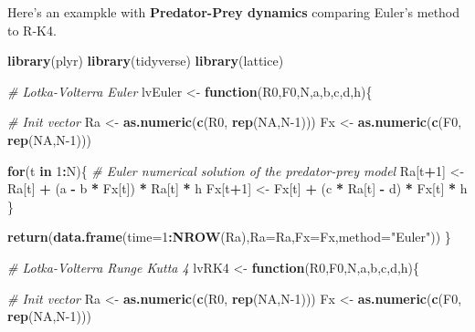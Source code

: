 \documentclass[12pt,]{book}
\newenvironment{Shaded}{\begin{snugshade}}{\end{snugshade}}
\newcommand{\CommentTok}[1]{\textcolor[rgb]{0.56,0.35,0.01}{\textit{#1}}}
\newcommand{\ControlFlowTok}[1]{\textcolor[rgb]{0.13,0.29,0.53}{\textbf{#1}}}
\newcommand{\DataTypeTok}[1]{\textcolor[rgb]{0.13,0.29,0.53}{#1}}
\newcommand{\DecValTok}[1]{\textcolor[rgb]{0.00,0.00,0.81}{#1}}
\newcommand{\KeywordTok}[1]{\textcolor[rgb]{0.13,0.29,0.53}{\textbf{#1}}}
\newcommand{\NormalTok}[1]{#1}
\newcommand{\OperatorTok}[1]{\textcolor[rgb]{0.81,0.36,0.00}{\textbf{#1}}}
\newcommand{\OtherTok}[1]{\textcolor[rgb]{0.56,0.35,0.01}{#1}}
\newcommand{\StringTok}[1]{\textcolor[rgb]{0.31,0.60,0.02}{#1}}
\begin{document}
Here's an exampkle with \textbf{Predator-Prey dynamics} comparing Euler's method to R-K4.

\begin{Shaded}
\begin{Highlighting}[]
\KeywordTok{library}\NormalTok{(plyr)}
\KeywordTok{library}\NormalTok{(tidyverse)}
\KeywordTok{library}\NormalTok{(lattice)}

\CommentTok{# Lotka-Volterra Euler}
\NormalTok{lvEuler <-}\StringTok{ }\ControlFlowTok{function}\NormalTok{(R0,F0,N,a,b,c,d,h)\{}

  \CommentTok{# Init vector}
\NormalTok{  Ra <-}\StringTok{ }\KeywordTok{as.numeric}\NormalTok{(}\KeywordTok{c}\NormalTok{(R0, }\KeywordTok{rep}\NormalTok{(}\OtherTok{NA}\NormalTok{,N}\DecValTok{-1}\NormalTok{)))}
\NormalTok{  Fx <-}\StringTok{ }\KeywordTok{as.numeric}\NormalTok{(}\KeywordTok{c}\NormalTok{(F0, }\KeywordTok{rep}\NormalTok{(}\OtherTok{NA}\NormalTok{,N}\DecValTok{-1}\NormalTok{)))}

  \ControlFlowTok{for}\NormalTok{(t }\ControlFlowTok{in} \DecValTok{1}\OperatorTok{:}\NormalTok{N)\{}
  \CommentTok{# Euler numerical solution of the predator-prey model}
\NormalTok{  Ra[t}\OperatorTok{+}\DecValTok{1}\NormalTok{] <-}\StringTok{ }\NormalTok{Ra[t] }\OperatorTok{+}\StringTok{ }\NormalTok{(a }\OperatorTok{-}\StringTok{ }\NormalTok{b }\OperatorTok{*}\StringTok{ }\NormalTok{Fx[t]) }\OperatorTok{*}\StringTok{ }\NormalTok{Ra[t] }\OperatorTok{*}\StringTok{ }\NormalTok{h}
\NormalTok{  Fx[t}\OperatorTok{+}\DecValTok{1}\NormalTok{] <-}\StringTok{ }\NormalTok{Fx[t] }\OperatorTok{+}\StringTok{ }\NormalTok{(c }\OperatorTok{*}\StringTok{ }\NormalTok{Ra[t] }\OperatorTok{-}\StringTok{ }\NormalTok{d) }\OperatorTok{*}\StringTok{ }\NormalTok{Fx[t] }\OperatorTok{*}\StringTok{ }\NormalTok{h}
\NormalTok{  \}}
  
  \KeywordTok{return}\NormalTok{(}\KeywordTok{data.frame}\NormalTok{(}\DataTypeTok{time=}\DecValTok{1}\OperatorTok{:}\KeywordTok{NROW}\NormalTok{(Ra),}\DataTypeTok{Ra=}\NormalTok{Ra,}\DataTypeTok{Fx=}\NormalTok{Fx,}\DataTypeTok{method=}\StringTok{"Euler"}\NormalTok{))}
\NormalTok{\}}

\CommentTok{# Lotka-Volterra Runge Kutta 4}
\NormalTok{lvRK4 <-}\StringTok{ }\ControlFlowTok{function}\NormalTok{(R0,F0,N,a,b,c,d,h)\{}

  \CommentTok{# Init vector}
\NormalTok{  Ra <-}\StringTok{ }\KeywordTok{as.numeric}\NormalTok{(}\KeywordTok{c}\NormalTok{(R0, }\KeywordTok{rep}\NormalTok{(}\OtherTok{NA}\NormalTok{,N}\DecValTok{-1}\NormalTok{)))}
\NormalTok{  Fx <-}\StringTok{ }\KeywordTok{as.numeric}\NormalTok{(}\KeywordTok{c}\NormalTok{(F0, }\KeywordTok{rep}\NormalTok{(}\OtherTok{NA}\NormalTok{,N}\DecValTok{-1}\NormalTok{)))}


\end{Highlighting}
\end{Shaded}
\end{document}
